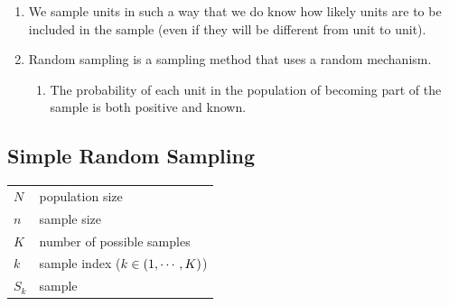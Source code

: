 \begin{enumerate}
    \item We sample units in such a way that we do know how likely units are to be included in the sample (even if they will be different from unit to unit).
    \hfill \cite{statistics/book/Statistics-for-Data-Scientists/Maurits-Kaptein}

    \item Random sampling is a sampling method that uses a random mechanism. 
    \hfill \cite{statistics/book/Statistics-for-Data-Scientists/Maurits-Kaptein}

    \begin{enumerate}
        \item The probability of each unit in the population of becoming part of the sample is both positive and known.
        \hfill \cite{statistics/book/Statistics-for-Data-Scientists/Maurits-Kaptein}


        
    \end{enumerate}
\end{enumerate}



\subsection{Simple Random Sampling \cite{statistics/book/Statistics-for-Data-Scientists/Maurits-Kaptein}}\label{Sampling Plans/Representative Sampling/Simple Random Sampling}

\begin{table}[H]
    \centering
    \begin{tabular}{l l}
        $N$ & population size \\
        $n$ & sample size \\
        $K$ & number of possible samples \\
        $k$ & sample index ($ k \in \left(1,\cdots,K\right)$) \\
        $S_k$ & sample\\
    \end{tabular}
\end{table}


